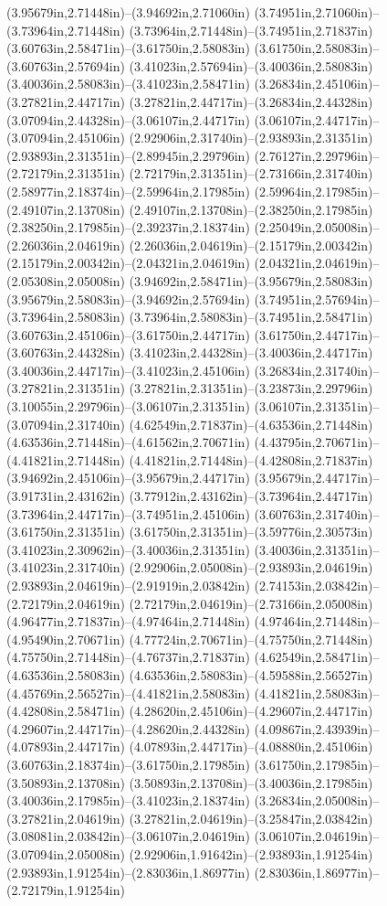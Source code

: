 (3.95679in,2.71448in)--(3.94692in,2.71060in) (3.74951in,2.71060in)--(3.73964in,2.71448in) (3.73964in,2.71448in)--(3.74951in,2.71837in) (3.60763in,2.58471in)--(3.61750in,2.58083in) (3.61750in,2.58083in)--(3.60763in,2.57694in) (3.41023in,2.57694in)--(3.40036in,2.58083in) (3.40036in,2.58083in)--(3.41023in,2.58471in) (3.26834in,2.45106in)--(3.27821in,2.44717in) (3.27821in,2.44717in)--(3.26834in,2.44328in) (3.07094in,2.44328in)--(3.06107in,2.44717in) (3.06107in,2.44717in)--(3.07094in,2.45106in) (2.92906in,2.31740in)--(2.93893in,2.31351in) (2.93893in,2.31351in)--(2.89945in,2.29796in) (2.76127in,2.29796in)--(2.72179in,2.31351in) (2.72179in,2.31351in)--(2.73166in,2.31740in) (2.58977in,2.18374in)--(2.59964in,2.17985in) (2.59964in,2.17985in)--(2.49107in,2.13708in) (2.49107in,2.13708in)--(2.38250in,2.17985in) (2.38250in,2.17985in)--(2.39237in,2.18374in) (2.25049in,2.05008in)--(2.26036in,2.04619in) (2.26036in,2.04619in)--(2.15179in,2.00342in) (2.15179in,2.00342in)--(2.04321in,2.04619in) (2.04321in,2.04619in)--(2.05308in,2.05008in) (3.94692in,2.58471in)--(3.95679in,2.58083in) (3.95679in,2.58083in)--(3.94692in,2.57694in) (3.74951in,2.57694in)--(3.73964in,2.58083in) (3.73964in,2.58083in)--(3.74951in,2.58471in) (3.60763in,2.45106in)--(3.61750in,2.44717in) (3.61750in,2.44717in)--(3.60763in,2.44328in) (3.41023in,2.44328in)--(3.40036in,2.44717in) (3.40036in,2.44717in)--(3.41023in,2.45106in) (3.26834in,2.31740in)--(3.27821in,2.31351in) (3.27821in,2.31351in)--(3.23873in,2.29796in) (3.10055in,2.29796in)--(3.06107in,2.31351in) (3.06107in,2.31351in)--(3.07094in,2.31740in) (4.62549in,2.71837in)--(4.63536in,2.71448in) (4.63536in,2.71448in)--(4.61562in,2.70671in) (4.43795in,2.70671in)--(4.41821in,2.71448in) (4.41821in,2.71448in)--(4.42808in,2.71837in) (3.94692in,2.45106in)--(3.95679in,2.44717in) (3.95679in,2.44717in)--(3.91731in,2.43162in) (3.77912in,2.43162in)--(3.73964in,2.44717in) (3.73964in,2.44717in)--(3.74951in,2.45106in) (3.60763in,2.31740in)--(3.61750in,2.31351in) (3.61750in,2.31351in)--(3.59776in,2.30573in) (3.41023in,2.30962in)--(3.40036in,2.31351in) (3.40036in,2.31351in)--(3.41023in,2.31740in) (2.92906in,2.05008in)--(2.93893in,2.04619in) (2.93893in,2.04619in)--(2.91919in,2.03842in) (2.74153in,2.03842in)--(2.72179in,2.04619in) (2.72179in,2.04619in)--(2.73166in,2.05008in) (4.96477in,2.71837in)--(4.97464in,2.71448in) (4.97464in,2.71448in)--(4.95490in,2.70671in) (4.77724in,2.70671in)--(4.75750in,2.71448in) (4.75750in,2.71448in)--(4.76737in,2.71837in) (4.62549in,2.58471in)--(4.63536in,2.58083in) (4.63536in,2.58083in)--(4.59588in,2.56527in) (4.45769in,2.56527in)--(4.41821in,2.58083in) (4.41821in,2.58083in)--(4.42808in,2.58471in) (4.28620in,2.45106in)--(4.29607in,2.44717in) (4.29607in,2.44717in)--(4.28620in,2.44328in) (4.09867in,2.43939in)--(4.07893in,2.44717in) (4.07893in,2.44717in)--(4.08880in,2.45106in) (3.60763in,2.18374in)--(3.61750in,2.17985in) (3.61750in,2.17985in)--(3.50893in,2.13708in) (3.50893in,2.13708in)--(3.40036in,2.17985in) (3.40036in,2.17985in)--(3.41023in,2.18374in) (3.26834in,2.05008in)--(3.27821in,2.04619in) (3.27821in,2.04619in)--(3.25847in,2.03842in) (3.08081in,2.03842in)--(3.06107in,2.04619in) (3.06107in,2.04619in)--(3.07094in,2.05008in) (2.92906in,1.91642in)--(2.93893in,1.91254in) (2.93893in,1.91254in)--(2.83036in,1.86977in) (2.83036in,1.86977in)--(2.72179in,1.91254in) 